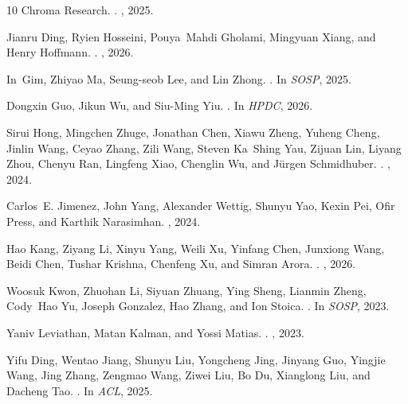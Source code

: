 \begin{thebibliography}{10}
{Chroma Research}.
.
, 2025.

Jianru Ding, Ryien Hosseini, Pouya~Mahdi Gholami, Mingyuan Xiang, and Henry
  Hoffmann.
.
, 2026.

In~Gim, Zhiyao Ma, Seung-seob Lee, and Lin Zhong.
.
\newblock In {\em SOSP}, 2025.

Dongxin Guo, Jikun Wu, and Siu-Ming Yiu.
.
\newblock In {\em HPDC}, 2026.

Sirui Hong, Mingchen Zhuge, Jonathan Chen, Xiawu Zheng, Yuheng Cheng, Jinlin
  Wang, Ceyao Zhang, Zili Wang, Steven Ka~Shing Yau, Zijuan Lin, Liyang Zhou,
  Chenyu Ran, Lingfeng Xiao, Chenglin Wu, and J{\"u}rgen Schmidhuber.
.
, 2024.

Carlos~E. Jimenez, John Yang, Alexander Wettig, Shunyu Yao, Kexin Pei, Ofir
  Press, and Karthik Narasimhan.
, 2024.

Hao Kang, Ziyang Li, Xinyu Yang, Weili Xu, Yinfang Chen, Junxiong Wang, Beidi
  Chen, Tushar Krishna, Chenfeng Xu, and Simran Arora.
.
, 2026.

Woosuk Kwon, Zhuohan Li, Siyuan Zhuang, Ying Sheng, Lianmin Zheng, Cody~Hao Yu,
  Joseph Gonzalez, Hao Zhang, and Ion Stoica.
.
\newblock In {\em SOSP}, 2023.

Yaniv Leviathan, Matan Kalman, and Yossi Matias.
.
, 2023.

Yifu Ding, Wentao Jiang, Shunyu Liu, Yongcheng Jing, Jinyang Guo, Yingjie
  Wang, Jing Zhang, Zengmao Wang, Ziwei Liu, Bo Du, Xianglong Liu, and
  Dacheng Tao.
.
\newblock In {\em ACL}, 2025.


\end{thebibliography}
